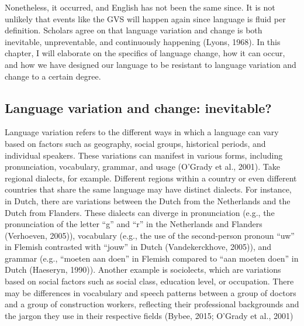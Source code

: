 Nonetheless, it occurred, and English has not been the same since. It is not unlikely that events like the GVS will happen again since language is fluid per definition. Scholars agree on that language variation and change is both inevitable, unpreventable, and continuously happening (Lyons, 1968). In this chapter, I will elaborate on the specifics of language change, how it can occur, and how we have designed our language to be resistant to language variation and change to a certain degree. 


\subsection{Language variation and change: inevitable?}

Language variation refers to the different ways in which a language can vary based on factors such as geography, social groups, historical periods, and individual speakers. These variations can manifest in various forms, including pronunciation, vocabulary, grammar, and usage (O’Grady et al., 2001). Take regional dialects, for example. Different regions within a country or even different countries that share the same language may have distinct dialects. For instance, in Dutch, there are variations between the Dutch from the Netherlands and the Dutch from Flanders. These dialects can diverge in pronunciation (e.g., the pronunciation of the letter “g” and “r” in the Netherlands and Flanders (Verhoeven, 2005)), vocabulary (e.g., the use of the second-person pronoun “uw” in Flemish contrasted with “jouw” in Dutch (Vandekerckhove, 2005)), and grammar (e.g., “moeten aan doen” in Flemish compared to “aan moeten doen” in Dutch (Haeseryn, 1990)). Another example is sociolects, which are variations based on social factors such as social class, education level, or occupation. There may be differences in vocabulary and speech patterns between a group of doctors and a group of construction workers, reflecting their professional backgrounds and the jargon they use in their respective fields (Bybee, 2015; O’Grady et al., 2001) 

